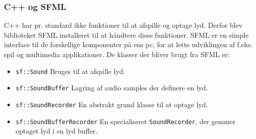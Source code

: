 \subsubsection{C++ og SFML}
C++ har pr. standard ikke funktioner til at afspille og optage lyd. Derfor blev biblioteket SFML installeret til at håndtere disse funktioner. SFML er en simple interface til de forskellige komponenter på ens pc, for at lette udviklingen af f.eks. spil og multimedia applikationer.
\newline
De klasser der bliver brugt fra SFML er:
\begin{itemize}
	\item \texttt{sf::Sound}
	\newline Bruges til at afspille lyd.
	
	\item \texttt{sf::\textcolor{dkgreen}{SoundBuffer}}
	\newline Lagring af audio samples der definere en lyd.
	
	\item \texttt{sf::\textcolor{dkgreen}{SoundRecorder}}
	\newline En abstrakt grund klasse til at optage lyd.
	
	\item \texttt{sf::\textcolor{dkgreen}{SoundBufferRecorder}}
	\newline En specialiseret \texttt{SoundRecorder}, der gemmer optaget lyd i en lyd buffer. 
\end{itemize}

